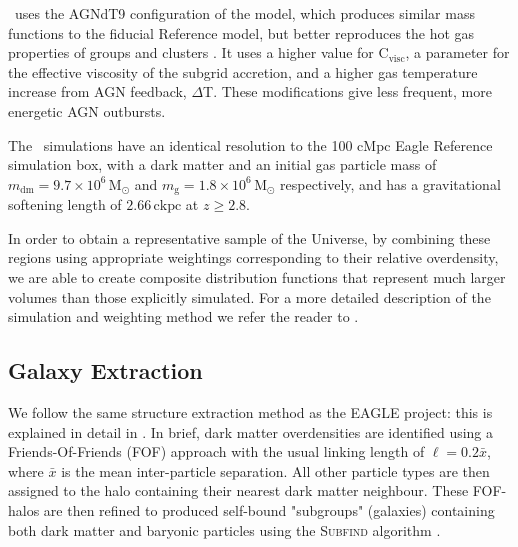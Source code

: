 \flares\ uses the AGNdT9 configuration of the model, which produces similar mass functions to the fiducial Reference model, but better reproduces the hot gas properties of groups and clusters \citep{barnes_cluster-eagle_2017}. 
It uses a higher value for C$_{\text{visc}}$, a parameter for the effective viscosity of the subgrid accretion, and a higher gas temperature increase from AGN feedback, $\Delta$T. 
These modifications give less frequent, more energetic AGN outbursts. 

The \flares\ simulations have an identical resolution to the 100 cMpc Eagle Reference simulation box, with a dark matter and an initial gas particle mass of $m_{\mathrm{dm}} = 9.7 \times 10^6\, \mathrm{M}_{\odot}$ and $m_{\mathrm{g}} = 1.8 \times 10^6\, \mathrm{M}_{\odot}$ respectively, and has a gravitational softening length of $2.66\, \mathrm{ckpc}$ at $z\geq2.8$. 

In order to obtain a representative sample of the Universe, by combining these regions using appropriate weightings corresponding to their relative overdensity, we are able to create composite distribution functions that represent much larger volumes than those explicitly simulated.
For a more detailed description of the simulation and weighting method we refer the reader to \cite{Lovell2021}.



\subsection{Galaxy Extraction}
\label{sec:extract}

We follow the same structure extraction method as the EAGLE project: this is explained in detail in \cite{Mcalpine_data}. In brief, dark matter overdensities are identified using a Friends-Of-Friends (FOF) approach \citep{davis_evolution_1985} with the usual linking length of $\ell=0.2\bar{x}$, where $\bar{x}$ is the mean inter-particle separation. All other particle types are then assigned to the halo containing their nearest dark matter neighbour. These FOF-halos are then refined to produced self-bound "subgroups" (galaxies) containing both dark matter and baryonic particles using the \textsc{Subfind} algorithm \citep{springel_populating_2001, Dolag2009}. 

